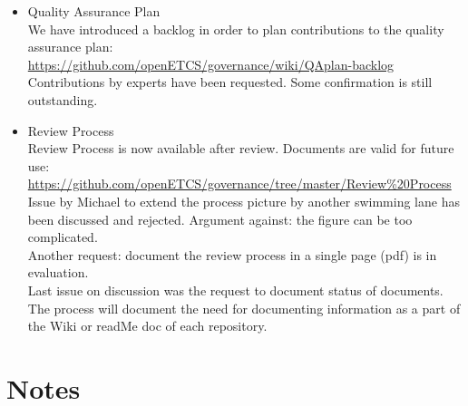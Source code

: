 \documentclass[a4paper, 11pt]{article}
\begin{document}
\begin{itemize}
\item Quality Assurance Plan\\
We have introduced a backlog in order to plan contributions to the quality assurance plan:\\
\url{https://github.com/openETCS/governance/wiki/QAplan-backlog}\\
Contributions by experts have been requested. Some confirmation is still outstanding.\\

\item Review Process\\
Review Process is now available after review. Documents are valid for future use:
\url{https://github.com/openETCS/governance/tree/master/Review%20Process}\\
Issue by Michael to extend the process picture by another swimming lane has been discussed and rejected. Argument against: the figure can be too complicated.\\
Another request: document the review process in a single page (pdf) is in evaluation.\\
Last issue on discussion was the request to document status of documents. The process will document the need for documenting information as a part of the Wiki or readMe doc of each repository.\\

\end{itemize}

\section{Notes}
\end{document}
